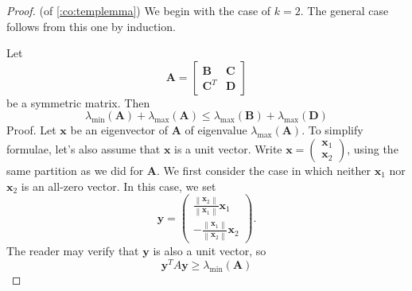 \documentclass{article}
\begin{document}
\begin{proof}(of \cref{:co:templemma})
We begin with the case of $k=2$. The general case follows from this one by induction.

Let
$$
\boldsymbol{A}=\left[\begin{array}{cc}
\boldsymbol{B} & \boldsymbol{C} \\
\boldsymbol{C}^{T} & \boldsymbol{D}
\end{array}\right]
$$
be a symmetric matrix. Then
$$
\lambda_{\min }(\boldsymbol{A})+\lambda_{\max }(\boldsymbol{A}) \leq \lambda_{\max }(\boldsymbol{B})+\lambda_{\max }(\boldsymbol{D})
$$
Proof. Let $\boldsymbol{x}$ be an eigenvector of $\boldsymbol{A}$ of eigenvalue $\lambda_{\max }(\boldsymbol{A})$. To simplify formulae, let's also assume that $\boldsymbol{x}$ is a unit vector. Write $\boldsymbol{x}=\left(\begin{array}{l}\boldsymbol{x}_{1} \\ \boldsymbol{x}_{2}\end{array}\right)$, using the same partition as we did for $\boldsymbol{A}$.
We first consider the case in which neither $\boldsymbol{x}_{1}$ nor $\boldsymbol{x}_{2}$ is an all-zero vector. In this case, we set
$$
\boldsymbol{y}=\left(\begin{array}{c}
\frac{\left\|\boldsymbol{x}_{2}\right\|}{\left\|\boldsymbol{x}_{1}\right\|} \boldsymbol{x}_{1} \\
-\frac{\left\|\boldsymbol{x}_{1}\right\|}{\left\|\boldsymbol{x}_{2}\right\|} \boldsymbol{x}_{2}
\end{array}\right) .
$$
The reader may verify that $\boldsymbol{y}$ is also a unit vector, so
$$
\boldsymbol{y}^{T} A \boldsymbol{y} \geq \lambda_{\min }(\boldsymbol{A})
$$


\end{proof}
\end{document}
